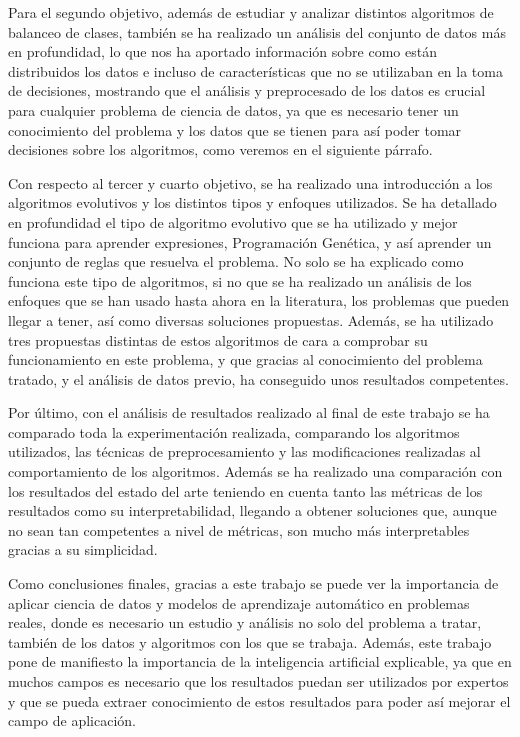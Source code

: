 Para el segundo objetivo, además de estudiar y analizar distintos algoritmos de balanceo de clases, también se ha realizado un análisis del conjunto de datos más en profundidad, lo que nos ha aportado información sobre como están distribuidos los datos e incluso de características que no se utilizaban en la toma de decisiones, mostrando que el análisis y preprocesado de los datos es crucial para cualquier problema de ciencia de datos, ya que es necesario tener un conocimiento del problema y los datos que se tienen para así poder tomar decisiones sobre los algoritmos, como veremos en el siguiente párrafo.

Con respecto al tercer y cuarto objetivo, se ha realizado una introducción a los algoritmos evolutivos y los distintos tipos y enfoques utilizados. Se ha detallado en profundidad el tipo de algoritmo evolutivo que se ha utilizado y mejor funciona para aprender expresiones, Programación Genética, y así aprender un conjunto de reglas que resuelva el problema. No solo se ha explicado como funciona este tipo de algoritmos, si no que se ha realizado un análisis de los enfoques que se han usado hasta ahora en la literatura, los problemas que pueden llegar a tener, así como diversas soluciones propuestas. Además, se ha utilizado tres propuestas distintas de estos algoritmos de cara a comprobar su funcionamiento en este problema, y que gracias al conocimiento del problema tratado, y el análisis de datos previo, ha conseguido unos resultados competentes.

Por último, con el análisis de resultados realizado al final de este trabajo se ha comparado toda la experimentación realizada, comparando los algoritmos utilizados, las técnicas de preprocesamiento y las modificaciones realizadas al comportamiento de los algoritmos. Además se ha realizado una comparación con los resultados del estado del arte teniendo en cuenta tanto las métricas de los resultados como su interpretabilidad, llegando a obtener soluciones que, aunque no sean tan competentes a nivel de métricas, son mucho más interpretables gracias a su simplicidad.

Como conclusiones finales, gracias a este trabajo se puede ver la importancia de aplicar ciencia de datos y modelos de aprendizaje automático en problemas reales, donde es necesario un estudio y análisis no solo del problema a tratar, también de los datos y algoritmos con los que se trabaja. Además, este trabajo pone de manifiesto la importancia de la inteligencia artificial explicable, ya que en muchos campos es necesario que los resultados puedan ser utilizados por expertos y que se pueda extraer conocimiento de estos resultados para poder así mejorar el campo de aplicación.


\newpage
